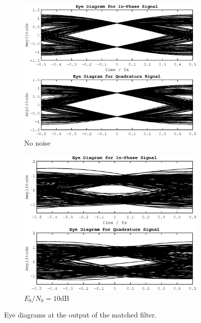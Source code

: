 \documentclass[paper=a4, fontsize=11pt]{scrartcl}	%
\numberwithin{equation}{section}		%
\numberwithin{figure}{section}			%
\numberwithin{table}{section}			%
\begin{document}
\begin{figure}
\centering
\begin{subfigure}{.5\textwidth}
  \centering
  \includegraphics[width=1\linewidth]{matp_EyeClean.eps}
  \caption{No noise}
  \label{fig:eyeClean}
\end{subfigure}%
\begin{subfigure}{.5\textwidth}
  \centering
  \includegraphics[width=1\linewidth]{matp_Eye10dB.eps}
  \caption{$E_b/N_0 = 10\text{dB}$}
  \label{fig:eyeDirty}
\end{subfigure}
\caption{Eye diagrams at the output of the matched filter.}
\label{fig:eye}
\end{figure}
\end{document}
